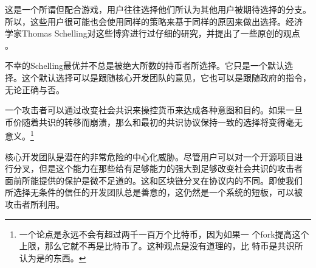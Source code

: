 \documentclass[letterpaper]{article}
\begin{document}
这是一个所谓但配合游戏，用户往往选择他们所认为其他用户被期待选择的分支。
所以，这些用户很可能也会使用同样的策略来基于同样的原因来做出选择。经济
学家Thomas Schelling对这些博弈进行过仔细的研究，并提出了一些原创的观点
\cite{schelling}。

不幸的Schelling最优并不总是被绝大所数的持币者所选择。它只是一个默认选
择。这个默认选择可以是跟随核心开发团队的意见，它也可以是跟随政府的指令，
无论正确与否。


一个攻击者可以通过改变社会共识来操控货币来达成各种意图和目的。如果一旦
币价随着共识的转移而崩溃，那么和最初的共识协议保持一致的选择将变得毫无
意义。\footnote{一个论点是永远不会有超过两千一百万个比特币，因为如果一
  个fork提高这个上限，那么它就不再是比特币了。这种观点是没有道理的，比
  特币是共识所认为是的东西。}

核心开发团队是潜在的非常危险的中心化威胁。尽管用户可以对一个开源项目进
行分叉，但是这个能力在那些给有足够能力的强大到足够改变社会共识的攻击者
面前所能提供的保护是微不足道的。这和区块链分叉在协议内的不同。即使我们
所选择无条件的信任的开发团队总是善意的，这仍然是一个系统的短板，可以被
攻击者所利用。
\end{document}
